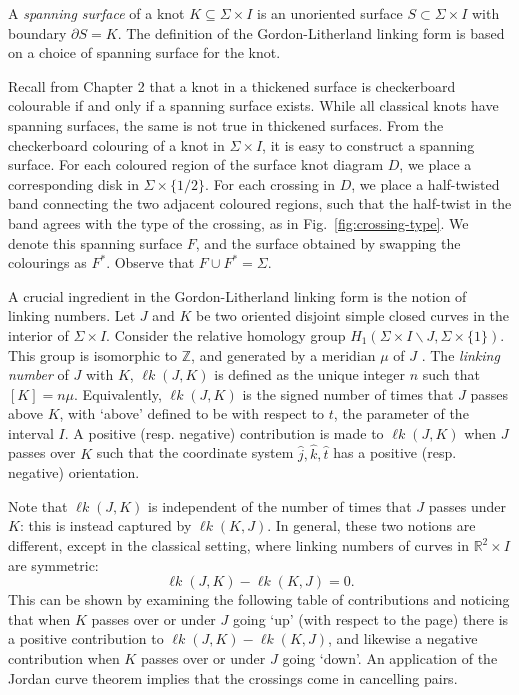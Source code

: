 \documentclass[12pt]{report}
\newcommand{\R}{\mathbb{R}}
\newcommand{\Z}{\mathbb{Z}}
\newcommand{\lk}{\operatorname{\ell\textit{k}}}
\theoremstyle{upright}
\begin{document}
A \textit{spanning surface} of a knot $K \subseteq \Sigma \times I$ is an unoriented surface $S \subset \Sigma \times I$ with boundary $\partial S = K$. The definition of the Gordon-Litherland linking form is based on a choice of spanning surface for the knot.

Recall from Chapter 2 that a knot in a thickened surface is checkerboard colourable if and only if a spanning surface exists. While all classical knots have spanning surfaces, the same is not true in thickened surfaces. From the checkerboard colouring of a knot in $\Sigma \times I$, it is easy to construct a spanning surface. For each coloured region of the surface knot diagram $D$, we place a corresponding disk in $\Sigma \times \{1/2\}$. For each crossing in $D$, we place a half-twisted band connecting the two adjacent coloured regions, such that the half-twist in the band agrees with the type of the crossing, as in Fig.~\ref{fig:crossing-type}. We denote this spanning surface $F$, and the surface obtained by swapping the colourings as $F^{*}$. Observe that $F \cup F^{*} = \Sigma$.

A crucial ingredient in the Gordon-Litherland linking form is the notion of linking numbers. Let $J$ and $K$ be two oriented disjoint simple closed curves in the interior of $\Sigma \times I$. Consider the relative homology group $H_{1}(\Sigma \times I \smallsetminus J, \Sigma \times \{1\})$. This group is isomorphic to $\Z$, and generated by a meridian $\mu$ of $J$ . The \textit{linking number} of $J$ with $K$, $\lk(J, K)$ is defined as the unique integer $n$ such that $[K] = n\mu$. Equivalently, $\lk(J, K)$ is the signed number of times that $J$ passes above $K$, with `above' defined to be with respect to $t$, the parameter of the interval $I$. A positive (resp. negative) contribution is made to $\lk(J, K)$ when $J$ passes over $K$ such that the coordinate system $\hat{j}, \hat{k}, \hat{t}$ has a positive (resp. negative) orientation.

Note that $\lk(J, K)$ is independent of the number of times that $J$ passes under $K$: this is instead captured by $\lk(K, J)$. In general, these two notions are different, except in the classical setting, where linking numbers of curves in $\R^{2} \times I$ are symmetric:
\[\lk(J, K) - \lk(K, J) = 0.\]
This can be shown by examining the following table of contributions and noticing that when $K$ passes over or under $J$ going `up' (with respect to the page) there is a positive contribution to $\lk(J, K) - \lk(K, J)$, and likewise a negative contribution when $K$ passes over or under $J$ going `down'. An application of the Jordan curve theorem implies that the crossings come in cancelling pairs.
\end{document}
